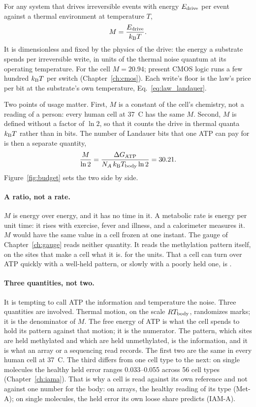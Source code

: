 \begin{definition}[M number]
For any system that drives irreversible events with energy $E_{\mathrm{drive}}$ per event against a thermal
environment at temperature $T$,
\[
  M=\frac{E_{\mathrm{drive}}}{k_{\mathrm B} T}.
\]
It is dimensionless and fixed by the physics of the drive: the energy a substrate spends per irreversible write, in units of the thermal noise
quantum at its operating temperature. For the cell $M=20.94$; present CMOS logic runs a few hundred $k_{\mathrm B} T$ per switch
(Chapter~\ref{ch:cmos}). Each write's floor is the law's price per bit at the substrate's own temperature, Eq.~\eqref{eq:law_landauer}.
\end{definition}

Two points of usage matter. First, $M$ is a constant of the cell's chemistry, not a reading of a
person: every human cell at 37~\textdegree C has the same $M$. Second, $M$ is defined without a
factor of $\ln2$, so that it counts the drive in thermal quanta $k_{\mathrm B} T$ rather than in bits. The number of Landauer bits that one ATP can
pay for is then a separate quantity,
\begin{equation}
  \frac{M}{\ln2}=\frac{\Delta G_{\mathrm{ATP}}}{N_A\,k_{\mathrm B}T_{\mathrm{body}}\ln2}=30.21 .
  \label{eq:bitsperATP}
\end{equation}
\calc{} Figure~\ref{fig:budget} sets the two side by side.

\paragraph{A ratio, not a rate.} $M$ is energy over energy, and it has no time in it. A metabolic rate is energy per unit time: it
rises with exercise, fever and illness, and a calorimeter measures it. $M$ would have the same value in a cell frozen at one instant.
The gauge of Chapter~\ref{ch:gauge} reads neither quantity. It reads the methylation pattern itself, on the sites that make a cell
what it is. \derived{} for the units. That a cell can turn over ATP quickly with a well-held pattern, or slowly with a poorly held
one, is \interp.

\paragraph{Three quantities, not two.} It is tempting to call ATP the information and temperature the noise. Three quantities are
involved. Thermal motion, on the scale $RT_{\mathrm{body}}$, randomizes marks; it is the denominator of $M$. The free energy of ATP is what the
cell spends to hold its pattern against that motion; it is the numerator. The pattern, which sites are held methylated and which are
held unmethylated, is the information, and it is what an array or a sequencing read records. The first two are the same in every
human cell at 37~\textdegree C. \derived{} The third differs from one cell type to the next: on single molecules the healthy held error ranges 0.033--0.055 across 56 cell types (Chapter~\ref{ch:iama}). \measured{} That is why a cell is read against its own reference and not against one number for the body: on arrays, the healthy reading of its type (Met-A); on single molecules, the held error its own loose share predicts (IAM-A).

